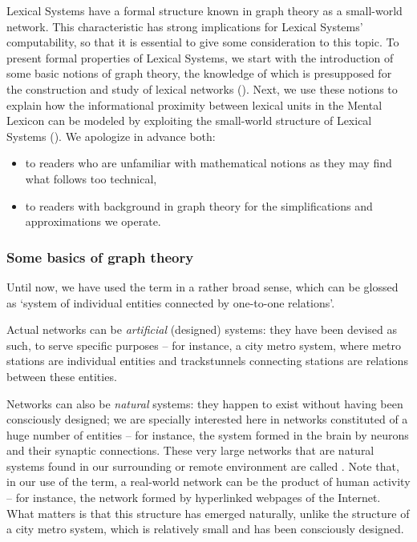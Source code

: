 Lexical Systems have a formal structure known in graph theory as a small-world network. This characteristic has strong implications for Lexical Systems' computability, so that it is essential to give some consideration to this topic. To present formal properties of Lexical Systems, we start with the introduction of some basic notions of graph theory, the knowledge of which is presupposed for the construction and study of lexical networks (). Next, we use these notions to explain how the informational proximity between lexical units in the Mental Lexicon can be modeled by exploiting the small-world structure of Lexical Systems (). We apologize in advance both:

\begin{itemize}
\item to readers who are unfamiliar with mathematical notions as they may find what follows too technical,
\item to readers with background in graph theory for the simplifications and approximations we operate.
\end{itemize}

\subsubsection{Some basics of graph theory}\label{sec:basicsGraphTheory}


Until now, we have used the term  in a rather broad sense, which can be glossed as `system of individual entities connected by one-to-one relations'.

Actual networks can be \emph{artificial} (designed) systems: they have been devised as such, to serve specific purposes -- for instance, a city metro system, where metro stations are individual entities and tracks\slashs{}tunnels connecting stations are relations between these entities.

Networks can also be \emph{natural} systems: they happen to exist without having been consciously designed; we are specially interested here in networks constituted of a huge number of entities -- for instance, the system formed in the brain by neurons and their synaptic connections. These very large networks that are natural systems found in our surrounding or remote environment are called . Note that, in our use of the term, a real-world network can be the product of human activity -- for instance, the network formed by hyperlinked webpages of the Internet. What matters is that this structure has emerged naturally, unlike the structure of a city metro system, which is relatively small and has been consciously designed.


